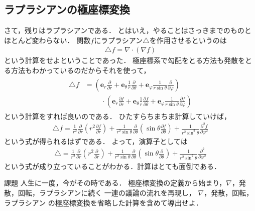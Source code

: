 \subsection{ラプラシアンの極座標変換}
さて，残りはラプラシアンである．
とはいえ，やることはさっきまでのものとほとんど変わらない．
関数$f$にラプラシアン$\bigtriangleup$を作用させるというのは
\begin{align*}
\bigtriangleup f = \nabla \cdot ( \nabla f)
\end{align*}
という計算をせよということであった．
極座標系で勾配をとる方法も発散をとる方法もわかっているのだからそれを使って，
\begin{align*}
\begin{aligned}
\bigtriangleup f & = \left(
\bm{e}_r \frac{ \partial } {\partial r} 
+ \bm{e}_{\theta} \frac{1}{r} \frac{ \partial } {\partial \theta}
+ \bm{e}_{\varphi} \frac{1}{r \sin \theta } \frac{ \partial } {\partial \varphi}
\right) \\ 
& \hspace{1cm} \cdot 
\left(
\bm{e}_r \frac{ \partial f } {\partial r} 
+ \bm{e}_{\theta} \frac{1}{r} \frac{ \partial f } {\partial \theta}
+ \bm{e}_{\varphi} \frac{1}{r \sin \theta } \frac{ \partial f } {\partial \varphi}
\right)
\end{aligned}
\end{align*}
という計算をすれば良いのである．
ひたすらちまちま計算していけば，
\begin{align}
\bigtriangleup f = \frac{1}{r^2} \frac{ \partial }{\partial r}
\left( r^2 \frac{\partial f }{\partial r } \right) + \frac{1}{r^2 \sin \theta}
\frac{ \partial }{\partial \theta} 
\left( \sin \theta \frac{ \partial f}{\partial \theta}\right)
+ \frac{1}{r^2 \sin^2 \theta} \frac{ \partial^2 f} { \partial \varphi^2} 
\label{eq:lapkyokuf}
\end{align}
という式が得られるはずである．
よって，演算子としては
\begin{align}
\bigtriangleup = \frac{1}{r^2} \frac{ \partial }{\partial r}
\left( r^2 \frac{\partial }{\partial r } \right) + \frac{1}{r^2 \sin \theta}
\frac{ \partial }{\partial \theta} 
\left( \sin \theta \frac{ \partial }{\partial \theta}\right)
+ \frac{1}{r^2 \sin^2 \theta} \frac{ \partial^2 } { \partial \varphi^2} 
\label{eq:lapkyoku}
\end{align}
という式が成り立っていることがわかる．計算はとても面倒である．

\begin{itembox}[l]{課題}
人生に一度，今がその時である．
極座標変換の定義から始まり，$\nabla$，発散，回転，ラプラシアンに続く
一連の議論の流れを再現し， $\nabla$，発散，回転，ラプラシアン
の極座標変換を省略した計算を含めて導出せよ．
\end{itembox}









